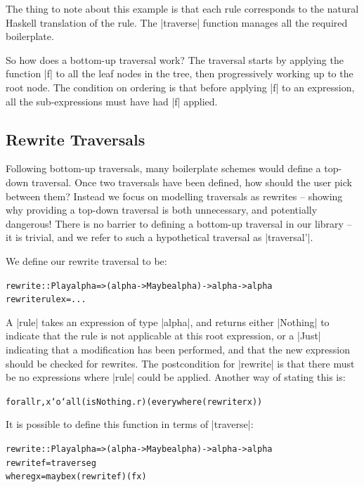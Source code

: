 \documentclass[preprint]{sigplanconf}
\newenvironment{code}{\begin{alltt}\small}{\end{alltt}}
\begin{document}
The thing to note about this example is that each rule corresponds to the natural Haskell translation of the rule. The |traverse| function manages all the required boilerplate.

So how does a bottom-up traversal work? The traversal starts by applying the function |f| to all the leaf nodes in the tree, then progressively working up to the root node. The condition on ordering is that before applying |f| to an expression, all the sub-expressions must have had |f| applied.

\subsection{Rewrite Traversals}

Following bottom-up traversals, many boilerplate schemes would define a top-down traversal. Once two traversals have been defined, how should the user pick between them? Instead we focus on modelling traversals as rewrites -- showing why providing a top-down traversal is both unnecessary, and potentially dangerous! There is no barrier to defining a bottom-up traversal in our library -- it is trivial, and we refer to such a hypothetical traversal as |traversal'|.

We define our rewrite traversal to be:

\begin{code}
rewrite :: Play alpha => (alpha -> Maybe alpha) -> alpha -> alpha
rewrite rule x = ...
\end{code}

A |rule| takes an expression of type |alpha|, and returns either |Nothing| to indicate that the rule is not applicable at this root expression, or a |Just| indicating that a modification has been performed, and that the new expression should be checked for rewrites. The postcondition for |rewrite| is that there must be no expressions where |rule| could be applied. Another way of stating this is:

\begin{code}
forall r, x `o` all (isNothing . r) (everywhere (rewrite r x))
\end{code}

It is possible to define this function in terms of |traverse|:

\begin{code}
rewrite :: Play alpha => (alpha -> Maybe alpha) -> alpha -> alpha
rewrite f = traverse g
    where g x = maybe x (rewrite f) (f x)
\end{code}
\end{document}
